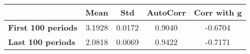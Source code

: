 \begin{tiny}\begin{tabular}{|l|c|c|c|c|}
\hline
&\textbf{Mean}&\textbf{Std}&\textbf{AutoCorr}&\textbf{Corr with g}\\\hline
\textbf{First 100 periods}&3.1928&0.0172&0.9040&-0.6704\\\hline
\textbf{Last 100 periods}&2.0818&0.0069&0.9422&-0.7171\\\hline
\end{tabular}
\end{tiny}